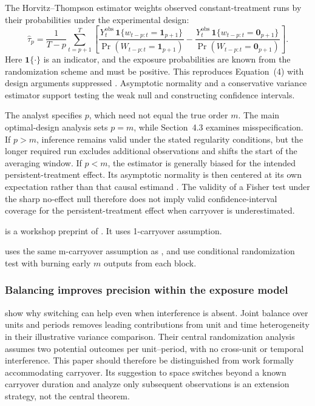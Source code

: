 The Horvitz--Thompson estimator weights observed constant-treatment runs by their probabilities under the experimental design:
\begin{equation}\label{eq:finite-memory-estimator}
\widehat{\tau}_p
=\frac{1}{T-p}\sum_{t=p+1}^{T}\left[
\frac{Y_t^{\mathrm{obs}}\,\mathbf{1}\{w_{t-p:t}=\mathbf{1}_{p+1}\}}
     {\Pr(W_{t-p:t}=\mathbf{1}_{p+1})}
-\frac{Y_t^{\mathrm{obs}}\,\mathbf{1}\{w_{t-p:t}=\mathbf{0}_{p+1}\}}
      {\Pr(W_{t-p:t}=\mathbf{0}_{p+1})}
\right].
\end{equation}
Here $\mathbf{1}\{\cdot\}$ is an indicator, and the exposure probabilities are known from the randomization scheme and must be positive. This reproduces Equation~(4) with design arguments suppressed \citep[pp.~3763--3764]{bojinov2023}. Asymptotic normality and a conservative variance estimator support testing the weak null and constructing confidence intervals.

The analyst specifies $p$, which need not equal the true order $m$. The main optimal-design analysis sets $p=m$, while Section~4.3 examines misspecification. If $p>m$, inference remains valid under the stated regularity conditions, but the longer required run excludes additional observations and shifts the start of the averaging window. If $p<m$, the estimator is generally biased for the intended persistent-treatment effect. Its asymptotic normality is then centered at its own expectation rather than that causal estimand \citep[p.~3768]{bojinov2023}. The validity of a Fisher test under the sharp no-effect null therefore does not imply valid confidence-interval coverage for the persistent-treatment effect when carryover is underestimated.

\citet{ni2022} is a workshop preprint of \cite{bojinov2023}. It uses 1-carryover assumption.

\cite{liuzhong2026} uses the same m-carryover assumption as \cite{bojinov2023}, and use conditional randomization test with burning early $m$ outputs from each block. 

\subsubsection{Balancing improves precision within the exposure model}
 

\citet{masoero2023} show why switching can help even when interference is absent. Joint balance over units and periods removes leading contributions from unit and time heterogeneity in their illustrative variance comparison. Their central randomization analysis assumes two potential outcomes per unit--period, with no cross-unit or temporal interference. This paper should therefore be distinguished from work formally accommodating carryover. Its suggestion to space switches beyond a known carryover duration and analyze only subsequent observations is an extension strategy, not the central theorem.

